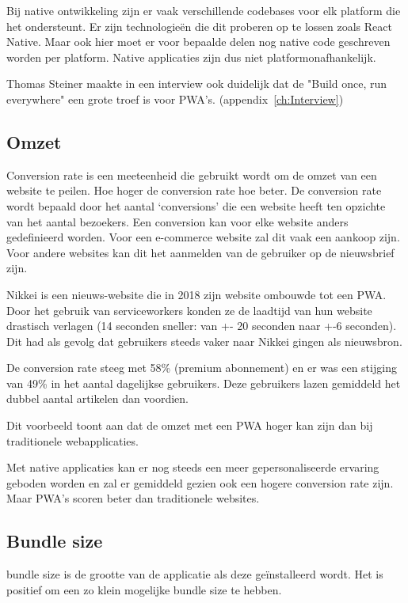 	Bij native ontwikkeling zijn er vaak verschillende codebases voor elk platform die het ondersteunt. Er zijn technologieën die dit proberen op te lossen zoals React Native. Maar ook hier moet er voor bepaalde delen nog native code geschreven worden per platform. Native applicaties zijn dus niet platformonafhankelijk. 
	
	Thomas Steiner maakte in een interview ook duidelijk dat de "Build once, run everywhere" een grote troef is voor PWA's.
	(appendix~\ref{ch:Interview})

\subsection{Omzet}
	Conversion rate is een meeteenheid die gebruikt wordt om de omzet van een website te peilen. Hoe hoger de conversion rate hoe beter. De conversion rate wordt bepaald door het aantal ‘conversions’ die een website heeft ten opzichte van het aantal bezoekers. Een conversion kan voor elke website anders gedefinieerd worden. Voor een e-commerce website zal dit vaak een aankoop zijn. Voor andere websites kan dit het aanmelden van de gebruiker op de nieuwsbrief zijn.
	\autocite{GoogleSupport2020}
	
	Nikkei is een nieuws-website die in 2018 zijn website ombouwde tot een PWA.  Door het gebruik van serviceworkers konden ze de laadtijd van hun website drastisch verlagen (14 seconden sneller:  van +- 20 seconden naar +-6 seconden). Dit had als gevolg dat gebruikers steeds vaker naar Nikkei gingen als nieuwsbron. 
	
	De conversion rate steeg met 58\% (premium abonnement) en er was een stijging van 49\% in het aantal dagelijkse gebruikers. Deze gebruikers lazen gemiddeld het dubbel aantal artikelen dan voordien. 
	\autocite{Developers2018}
	
	Dit voorbeeld toont aan dat de omzet met een PWA hoger kan zijn dan bij traditionele webapplicaties.
	
	Met native applicaties kan er nog steeds een meer gepersonaliseerde ervaring geboden worden en zal er gemiddeld gezien ook een hogere conversion rate zijn. Maar PWA's scoren beter dan traditionele websites.
	\autocite{Anastasia2019}
	

\subsection{Bundle size}
\begin{center}

\end{center}
	bundle size is de grootte van de applicatie als deze geïnstalleerd wordt. Het is positief om een zo klein mogelijke bundle size te hebben. \autocite{Scott2019}
	
